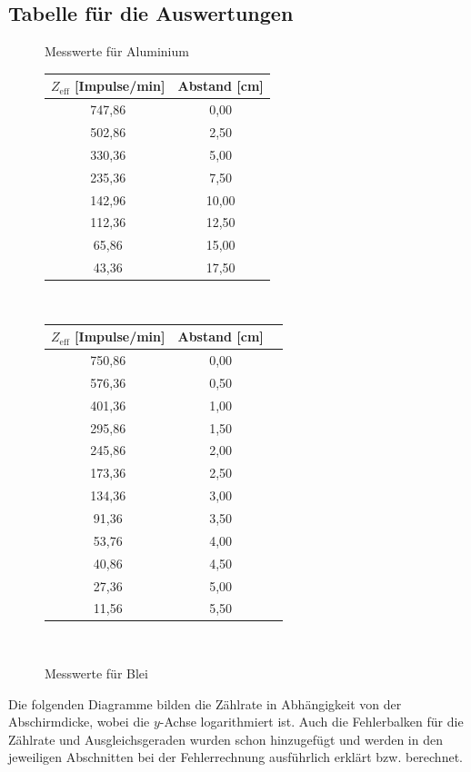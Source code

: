 \documentclass[fontsize=12pt]{scrartcl}
\begin{document}
\subsection{Tabelle für die Auswertungen}
\begin{figure}[h!]
\begin{minipage}{0.5\textwidth}
\centering
\caption{Messwerte  für Aluminium}
\begin{tabular}{|c|c|} \hline
$Z_{\text{eff}}$ [Impulse/min]	&	Abstand [cm] \\ \hline
747,86	&0,00 \\ \hline
502,86	&2,50\\ \hline
330,36	&5,00\\ \hline
235,36	&7,50\\ \hline
142,96	&10,00\\ \hline
112,36	&12,50\\ \hline
65,86	&15,00\\ \hline
43,36	&17,50\\ \hline
\end{tabular} \\
\end{minipage}
\begin{minipage}{0.5\textwidth}
\centering
\caption{Messwerte  für Blei}
\begin{tabular}{|c|c|c|} \hline
$Z_{\text{eff}}$ [Impulse/min]	&Abstand [cm] \\ \hline
750,86	&0,00 \\ \hline
576,36	&0,50 \\ \hline
401,36	&1,00 \\ \hline
295,86	&1,50 \\ \hline
245,86	&2,00 \\ \hline
173,36	&2,50 \\ \hline
134,36	&3,00 \\ \hline
91,36	&3,50 \\ \hline
53,76	&4,00 \\ \hline
40,86	&4,50 \\ \hline
27,36	&5,00 \\ \hline
11,56	&5,50 \\ \hline
\end{tabular} \\
\end{minipage}
\end{figure}
\noindent
Die folgenden Diagramme bilden die Zählrate in Abhängigkeit von der Abschirmdicke, wobei die $y$-Achse logarithmiert ist. Auch die Fehlerbalken für die Zählrate und Ausgleichsgeraden wurden schon hinzugefügt und werden in den jeweiligen Abschnitten bei der Fehlerrechnung ausführlich erklärt bzw. berechnet. 
\end{document}
